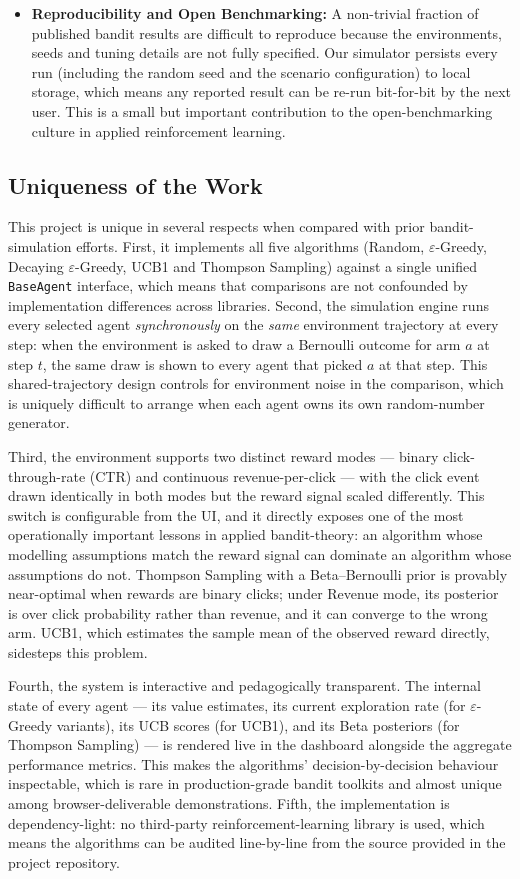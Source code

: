 \begin{itemize}
\item \textbf{Reproducibility and Open Benchmarking:} A non-trivial fraction of published bandit results are difficult to reproduce because the environments, seeds and tuning details are not fully specified. Our simulator persists every run (including the random seed and the scenario configuration) to local storage, which means any reported result can be re-run bit-for-bit by the next user. This is a small but important contribution to the open-benchmarking culture in applied reinforcement learning.
\end{itemize}

\subsection{Uniqueness of the Work}
This project is unique in several respects when compared with prior bandit-simulation efforts. First, it implements all five algorithms (Random, $\varepsilon$-Greedy, Decaying $\varepsilon$-Greedy, UCB1 and Thompson Sampling) against a single unified \texttt{BaseAgent} interface, which means that comparisons are not confounded by implementation differences across libraries. Second, the simulation engine runs every selected agent \emph{synchronously} on the \emph{same} environment trajectory at every step: when the environment is asked to draw a Bernoulli outcome for arm $a$ at step $t$, the same draw is shown to every agent that picked $a$ at that step. This shared-trajectory design controls for environment noise in the comparison, which is uniquely difficult to arrange when each agent owns its own random-number generator.

Third, the environment supports two distinct reward modes --- binary click-through-rate (CTR) and continuous revenue-per-click --- with the click event drawn identically in both modes but the reward signal scaled differently. This switch is configurable from the UI, and it directly exposes one of the most operationally important lessons in applied bandit-theory: an algorithm whose modelling assumptions match the reward signal can dominate an algorithm whose assumptions do not. Thompson Sampling with a Beta--Bernoulli prior is provably near-optimal when rewards are binary clicks; under Revenue mode, its posterior is over click probability rather than revenue, and it can converge to the wrong arm. UCB1, which estimates the sample mean of the observed reward directly, sidesteps this problem.

Fourth, the system is interactive and pedagogically transparent. The internal state of every agent --- its value estimates, its current exploration rate (for $\varepsilon$-Greedy variants), its UCB scores (for UCB1), and its Beta posteriors (for Thompson Sampling) --- is rendered live in the dashboard alongside the aggregate performance metrics. This makes the algorithms' decision-by-decision behaviour inspectable, which is rare in production-grade bandit toolkits and almost unique among browser-deliverable demonstrations. Fifth, the implementation is dependency-light: no third-party reinforcement-learning library is used, which means the algorithms can be audited line-by-line from the source provided in the project repository.

